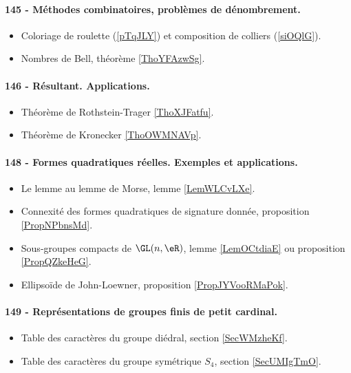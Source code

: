 \paragraph{145 - Méthodes combinatoires, problèmes de dénombrement.}
\begin{itemize}
    \item Coloriage de roulette (\ref{pTqJLY}) et composition de colliers (\ref{siOQlG}).
    \item Nombres de Bell, théorème \ref{ThoYFAzwSg}.
\end{itemize}
\paragraph{146 - Résultant. Applications.}
\begin{itemize}
    \item Théorème de Rothstein-Trager \ref{ThoXJFatfu}.
    \item Théorème de Kronecker \ref{ThoOWMNAVp}.
\end{itemize}
\paragraph{148 - Formes quadratiques réelles. Exemples et applications.}
\begin{itemize}
    \item Le lemme au lemme de Morse, lemme \ref{LemWLCvLXe}.
    \item Connexité des formes quadratiques de signature donnée, proposition \ref{PropNPbnsMd}.
    \item Sous-groupes compacts de \( \GL(n,\eR)\), lemme \ref{LemOCtdiaE} ou proposition \ref{PropQZkeHeG}.
    \item Ellipsoïde de John-Loewner, proposition \ref{PropJYVooRMaPok}.
\end{itemize}
\paragraph{149 - Représentations de groupes finis de petit cardinal.}
\begin{itemize}
    \item Table des caractères du groupe diédral, section \ref{SecWMzheKf}.
    \item Table des caractères du groupe symétrique \( S_4\), section \ref{SecUMIgTmO}.
\end{itemize}
